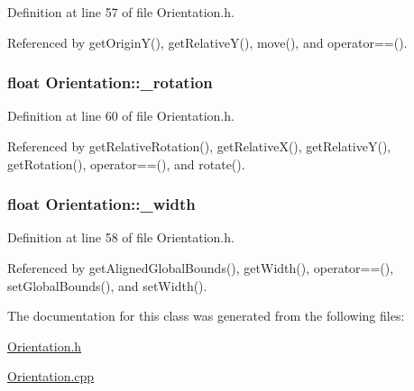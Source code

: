Definition at line 57 of file Orientation.\-h.



Referenced by get\-Origin\-Y(), get\-Relative\-Y(), move(), and operator==().

\hypertarget{classOrientation_ab75afc35c00f204c390ab2ffe716374a}{
\subsubsection[{\-\_\-rotation}]{\setlength{\rightskip}{0pt plus 5cm}float Orientation\-::\-\_\-rotation\hspace{0.3cm}{\ttfamily [private]}}}\label{classOrientation_ab75afc35c00f204c390ab2ffe716374a}


Definition at line 60 of file Orientation.\-h.



Referenced by get\-Relative\-Rotation(), get\-Relative\-X(), get\-Relative\-Y(), get\-Rotation(), operator==(), and rotate().

\hypertarget{classOrientation_a5052b45396fc5e6abcf343c60e1fa59d}{
\subsubsection[{\-\_\-width}]{\setlength{\rightskip}{0pt plus 5cm}float Orientation\-::\-\_\-width\hspace{0.3cm}{\ttfamily [private]}}}\label{classOrientation_a5052b45396fc5e6abcf343c60e1fa59d}


Definition at line 58 of file Orientation.\-h.



Referenced by get\-Aligned\-Global\-Bounds(), get\-Width(), operator==(), set\-Global\-Bounds(), and set\-Width().



The documentation for this class was generated from the following files\-:\begin{DoxyCompactItemize}
\item 
\hyperlink{Orientation_8h}{Orientation.\-h}\item 
\hyperlink{Orientation_8cpp}{Orientation.\-cpp}\end{DoxyCompactItemize}
